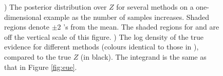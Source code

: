 \documentclass{article} %
\begin{document}
% 
% 
% 
% 

\begin{figure}
	\begin{subfigure}[b]{7.5cm}
		\caption{}
		\label{fig:se}
	\end{subfigure}
	\begin{subfigure}[b]{6cm}
		\caption{}
		\label{fig:nll}
	\end{subfigure}
	\caption{) The posterior distribution over $Z$ for several methods on a one-dimensional example as the number of samples increases.  Shaded regions denote $\pm2$ 's from the mean.  The shaded regions for  and  are off the vertical scale of this figure. ) The log density of the true evidence for different methods (colours identical to those in ), compared to the true $Z$ (in black).  The integrand is the same as that in Figure \ref{fig:eue}.}
\end{figure}
\end{document}
